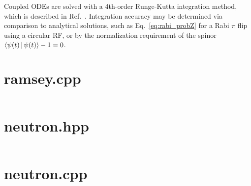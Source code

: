 %
Coupled ODEs are solved with a 4th-order Runge-Kutta integration method, which is described in Ref.~\cite{numerical_recipes}. Integration accuracy may be determined via comparison to analytical solutions, such as Eq.~\ref{eq:rabi_probZ} for a Rabi $\pi$ flip using a circular RF, or by the normalization requirement of the spinor $\Braket{\psi(t) | \psi(t)} - 1 = 0$.

\section{ramsey.cpp}

\inputminted{cpp}{code_snippets/ramsey.cpp}

\section{neutron.hpp}

\inputminted{cpp}{code_snippets/neutron.hpp}

\section{neutron.cpp}

\inputminted{cpp}{code_snippets/neutron.cpp}